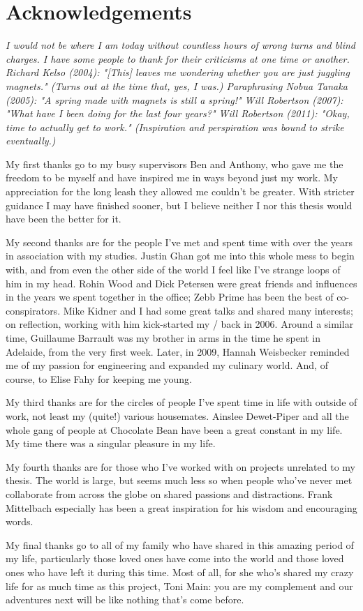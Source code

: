 
\section{Acknowledgements}

\itshape
I would not be where I am today without countless hours of wrong turns and
blind charges.
I have some people to thank for their criticisms at one time or another.
Richard Kelso (2004): "[This] leaves me wondering whether you are just juggling magnets." (Turns out at the time that, yes, I was.)
Paraphrasing Nobua Tanaka (2005): "A spring made with magnets is still a spring!"
Will Robertson (2007): "What have I been doing for the last four years?"
Will Robertson (2011): "Okay, time to actually get to work."
(Inspiration and perspiration was bound to strike eventually.)

My first thanks go to my busy supervisors Ben and Anthony, who gave me the freedom to be myself and have inspired me in ways beyond just my work.
My appreciation for the long leash they allowed me couldn't be greater.
With stricter guidance I may have finished sooner, but I believe neither I nor this thesis would have been the better for it.

My second thanks are for the people I've met and spent time with over the years in association with my studies.
Justin Ghan got me into this whole mess to begin with, and from even the other side of the world I feel like I've strange loops of him in my head.
Rohin Wood and Dick Petersen were great friends and influences in the years we spent together in the office; Zebb Prime has been the best of co-conspirators.
Mike Kidner and I had some great talks and shared many interests; on reflection, working with him kick-started my \PhD/ back in 2006.
Around a similar time, Guillaume Barrault was my brother in arms in the time he spent in Adelaide, from the very first week.
Later, in 2009, Hannah Weisbecker reminded me of my passion for engineering and expanded my culinary world.
And, of course, to Elise Fahy for keeping me young.

My third thanks are for the circles of people I've spent time in life with outside of work, not least my (quite!) various housemates.
Ainslee Dewet-Piper and all the whole gang of people at Chocolate Bean have been a great constant in my life.
My time there was a singular pleasure in my life.

My fourth thanks are for those who I've worked with on projects unrelated to my thesis.
The world is large, but seems much less so when people who've never met collaborate from across the globe on shared passions and distractions.
Frank Mittelbach especially has been a great inspiration for his wisdom and encouraging words.

My final thanks go to all of my family who have shared in this amazing period of my life, particularly those loved ones have come into the world and those loved ones who have left it during this time.
Most of all, for she who's shared my crazy life for as much time as this project, Toni Main: you are my complement and our adventures next will be like nothing that's come before.
\upshape
